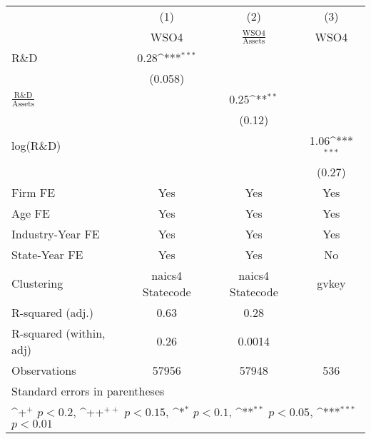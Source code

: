 {
\def\sym#1{\ifmmode^{#1}\else\(^{#1}\)\fi}
\begin{tabular}{l*{3}{c}}
\toprule
                    &\multicolumn{1}{c}{(1)}&\multicolumn{1}{c}{(2)}&\multicolumn{1}{c}{(3)}\\
                    &\multicolumn{1}{c}{WSO4}&\multicolumn{1}{c}{$\frac{\textrm{WSO4}}{\textrm{Assets}}$}&\multicolumn{1}{c}{WSO4}\\
\midrule
R\&D                &        0.28\sym{***}&                     &                     \\
                    &     (0.058)         &                     &                     \\
\addlinespace
$\frac{\textrm{R\&D}}{\textrm{Assets}}$&                     &        0.25\sym{**} &                     \\
                    &                     &      (0.12)         &                     \\
\addlinespace
log(R\&D)           &                     &                     &        1.06\sym{***}\\
                    &                     &                     &      (0.27)         \\
\addlinespace
Firm FE             &         Yes         &         Yes         &         Yes         \\
\addlinespace
Age FE              &         Yes         &         Yes         &         Yes         \\
\addlinespace
Industry-Year FE    &         Yes         &         Yes         &         Yes         \\
\addlinespace
State-Year FE       &         Yes         &         Yes         &          No         \\
\midrule
Clustering          &naics4 Statecode         &naics4 Statecode         &       gvkey         \\
R-squared (adj.)    &        0.63         &        0.28         &                     \\
R-squared (within, adj)&        0.26         &      0.0014         &                     \\
Observations        &       57956         &       57948         &         536         \\
\bottomrule
\multicolumn{4}{l}{\tiny Standard errors in parentheses}\\
\multicolumn{4}{l}{\tiny \sym{+} \(p<0.2\), \sym{++} \(p<0.15\), \sym{*} \(p<0.1\), \sym{**} \(p<0.05\), \sym{***} \(p<0.01\)}\\
\end{tabular}
}
